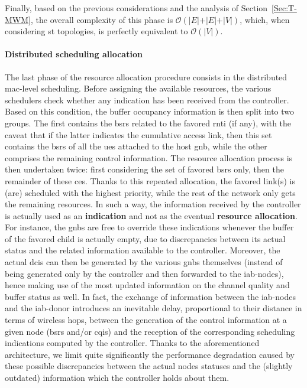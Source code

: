 Finally, based on the previous considerations and the analysis of Section~\ref{Sec:T-MWM}, the overall complexity of this phase is $ \mathcal{O} \left( \vert E \vert + \vert E \vert + \vert V \vert \right)$, which, when considering \gls{st} topologies, is perfectly equivalent to $ \mathcal{O} \left(  \vert V \vert \right)$.

\paragraph{Distributed scheduling allocation}
The last phase of the resource allocation procedure consists in the distributed \gls{mac}-level scheduling. Before assigning the available resources, the various schedulers check whether any indication has been received from the controller. Based on this condition, the buffer occupancy information is then split into two groups.
The first contains the \gls{bsr}s related to the favored \gls{rnti} (if any), with the caveat that if the latter indicates the cumulative access link, then this set contains the \gls{bsr}s of all the \gls{ue}s attached to the host \gls{gnb}, while the other comprises the remaining control information.
The resource allocation process is then undertaken twice: first considering the set of favored \gls{bsr}s only, then the remainder of these \glspl{ce}. 
Thanks to this repeated allocation, the favored link(s) is (are) scheduled with the highest priority, while the rest of the network only gets the remaining resources. In such a way, the information received by the controller is actually used as an \textbf{indication} and not as the eventual \textbf{resource allocation}. For instance, the \glspl{gnb} are free to override these indications whenever the buffer of the favored child is actually empty, due to discrepancies between its actual status and the related information available to the controller. Moreover, the actual \glspl{dci} can then be generated by the various \glspl{gnb} themselves (instead of being generated only by the controller and then forwarded to the \gls{iab}-nodes), hence making use of the most updated information on the channel quality and buffer status as well. In fact, the exchange of information between the \gls{iab}-nodes and the \gls{iab}-donor introduces an inevitable delay, proportional to their distance in terms of wireless hops, between the generation of the control information at a given node (\glspl{bsr} and/or \glspl{cqi}) and the reception of the corresponding scheduling indications computed by the controller. Thanks to the aforementioned architecture, we limit quite significantly the performance degradation caused by these possible discrepancies between the actual nodes statuses and the (slightly outdated) information which the controller holds about them.

